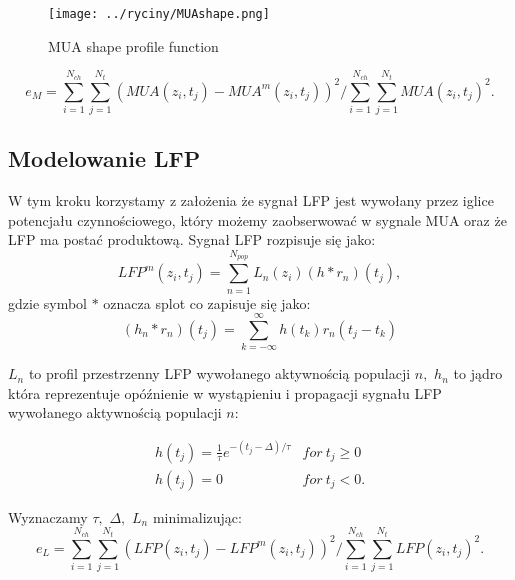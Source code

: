 \begin{figure}
\caption{MUA shape profile function}
\label{MUAshape}
\texttt{[image: ../ryciny/MUAshape.png]}
\end{figure}

\begin{equation}
e_M = \sum^{N_{ch}}_{i=1}\sum^{N_t}_{j=1} \left( MUA(z_i, t_j) - MUA^m(z_i, t_j) \right)^2/ \sum^{N_{ch}}_{i=1}\sum^{N_t}_{j=1} MUA(z_i, t_j)^2.
\label{MUAerror}
\end{equation}

\subsection{Modelowanie LFP}
W tym kroku korzystamy z założenia że sygnał LFP jest wywołany przez iglice potencjału czynnościowego, który możemy zaobserwować w sygnale MUA oraz że LFP ma postać produktową. Sygnał LFP rozpisuje się jako:
\begin{equation}
 LFP^m(z_i, t_j) = \sum^{N_{pop}}_{n=1}L_n(z_i)(h*r_n)(t_j),
 \label{LFPdecomposition}
\end{equation}
gdzie symbol $*$ oznacza splot co zapisuje się jako:
\begin{equation}
(h_n*r_n)(t_j) = \sum_{k = -\infty}^{\infty}h(t_k)r_n(t_j - t_k)
\label{splot}
\end{equation}

$L_n$ to profil przestrzenny LFP wywołanego aktywnością populacji $n,$ $h_n$ to jądro która reprezentuje opóźnienie w wystąpieniu i propagacji sygnału LFP wywołanego aktywnością populacji $n:$


\begin{eqnarray}
\label{h_function}
h(t_j) = \frac{1}{\tau}e^{-(t_j - \Delta)/\tau}  &for \ t_j \geq 0\\
h(t_j) = 0 &for \ t_j <0.
\end{eqnarray}

Wyznaczamy $\tau,$ $\Delta,$ $L_n$ minimalizując:
\begin{equation}
e_L = \sum^{N_{ch}}_{i=1}\sum^{N_t}_{j=1} \left( LFP(z_i, t_j) - LFP^m(z_i, t_j) \right)^2/ \sum^{N_{ch}}_{i=1}\sum^{N_t}_{j=1} LFP(z_i, t_j)^2.
\label{LFPerror}
\end{equation}